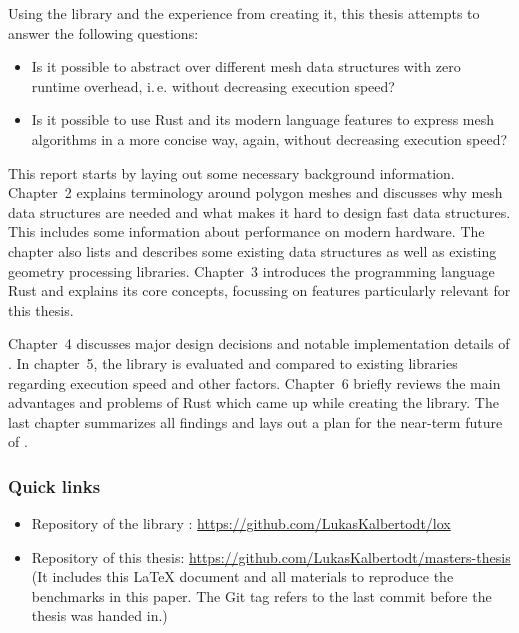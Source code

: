 \newpage

Using the library  and the experience from creating it, this thesis attempts to answer the following questions:

\begin{itemize}
  \item Is it possible to abstract over different mesh data structures with zero runtime overhead, i.\,e. without decreasing execution speed?
  \item Is it possible to use Rust and its modern language features to express mesh algorithms in a more concise way, again, without decreasing execution speed?
\end{itemize}


\vspace{1cm}

This report starts by laying out some necessary background information.
Chapter~2 explains terminology around polygon meshes and discusses why mesh data structures are needed and what makes it hard to design fast data structures.
This includes some information about performance on modern hardware.
The chapter also lists and describes some existing data structures as well as existing geometry processing libraries.
Chapter~3 introduces the programming language Rust and explains its core concepts, focussing on features particularly relevant for this thesis.

Chapter~4 discusses major design decisions and notable implementation details of .
In chapter~5, the library is evaluated and compared to existing libraries regarding execution speed and other factors.
Chapter~6 briefly reviews the main advantages and problems of Rust which came up while creating the library.
The last chapter summarizes all findings and lays out a plan for the near-term future of .


\vfill

\subsubsection*{Quick links}
\begin{itemize}
  \item Repository of the library : \textcolor{link-blue}{\url{https://github.com/LukasKalbertodt/lox}}
  \item Repository of this thesis: \textcolor{link-blue}{\url{https://github.com/LukasKalbertodt/masters-thesis}}\\
  {\footnotesize (It includes this \LaTeX{} document and all materials to reproduce the benchmarks in this paper.
  The Git tag  refers to the last commit before the thesis was handed in.)}
\end{itemize}

\vspace{2cm}
